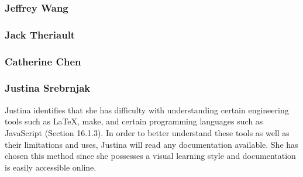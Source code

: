 \documentclass[12pt]{article}
\begin{document}
\subsubsection{Jeffrey Wang}
\subsubsection{Jack Theriault}
\subsubsection{Catherine Chen}
\subsubsection{Justina Srebrnjak}
Justina identifies that she has difficulty with understanding certain engineering tools such as \LaTeX, make, and certain programming languages such as JavaScript (Section 16.1.3). In order to better understand these tools as well as their limitations and uses, Justina will read any documentation available. She has chosen this method since she possesses a visual learning style and documentation is easily accessible online.
\end{document}
